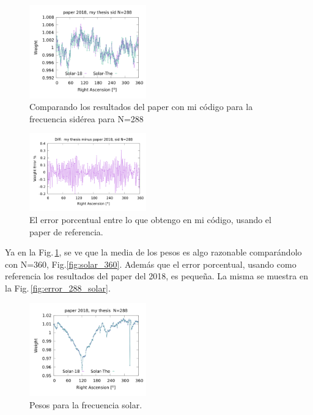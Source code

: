 \begin{figure}[H]
	\centering
	\includegraphics[width=0.45\textwidth]{Graficos/sidereal_my_and_paper_in_288.png}
	\caption{Comparando los resultados del paper con mi código para la frecuencia sidérea para N=288}
	\label{fig:sidereal_288}
\end{figure}


\begin{figure}[H]
	\centering
	\includegraphics[width=0.45\textwidth]{Graficos/sidereal_my_and_paper_in_288_error.png}
	\caption{El error porcentual entre lo que obtengo en mi código, usando el paper de referencia.}
	\label{fig:error_288_sidereal}
\end{figure}


Ya en la Fig.\,\ref{fig:sidereal_288}, se ve que la media de los pesos es algo razonable comparándolo con N=360, Fig.\ref{fig:solar_360}. Además que el error porcentual, usando como referencia los resultados del paper del 2018, es pequeña. La misma se muestra en la Fig.\,\ref{fig:error_288_solar}.

\begin{figure}[H]
	\centering
	\includegraphics[width=0.45\textwidth]{Graficos/solar_my_and_paper_2018_in_288.png}
	\caption{Pesos para la frecuencia solar.}
	\label{fig:solar_288}
\end{figure}


